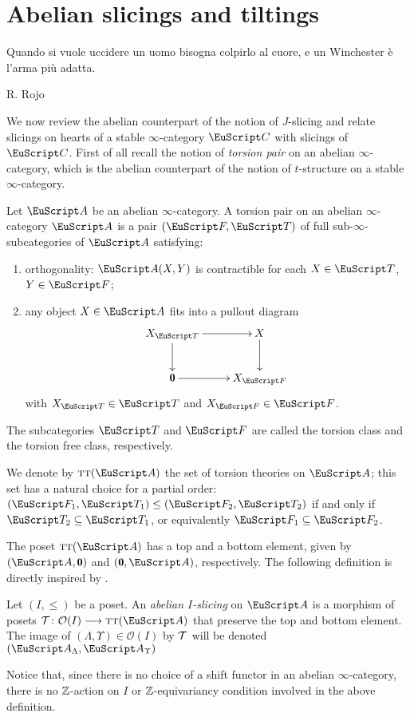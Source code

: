 \newcommand{\tilted}{\mathrel{\lightning}\!}
\section{Abelian slicings and tiltings}\label{tiltings}
\begin{modifyepigraph}{.9}
\epigraph{Quando si vuole uccidere un uomo bisogna colpirlo al cuore, e un Winchester è l'arma più adatta.}{R\@. Rojo}
\end{modifyepigraph}
We now review the abelian counterpart of the notion of $J$-slicing and relate slicings on hearts of a stable $\infty$-category $\C$ with slicings of $\C$. First of all recall the notion of \textit{torsion pair} on an abelian $\infty$-category, which is the abelian counterpart of the notion of $t$-structure on a stable $\infty$-category.
\begin{definition}
Let $\cA$ be an abelian $\infty$-category.
A torsion pair on an abelian $\infty$-category $\cA$ is a pair $(\cate{F},\cate{T})$ of full sub-$\infty$-subcategories of $\cA$ satisfying:
 \begin{enumerate}[label=$\roman*$)]
\item orthogonality: $\cA(X,Y)$ is contractible for each $X \in \cate{T}$, $Y \in \cate{F}$;
\item any object $X \in \cA$ fits into a pullout diagram
\[
\xymatrix{
X_{\cate{T}}\ar[d]\ar[r]& X\ar[d]\\
\zero\ar[r]& X_{\cate{F}}
}
\]
with $ X_{\cate{T}} \in \cate{T}$ and $X_{\cate{F}} \in \cate{F}$. 
 \end{enumerate}
 The subcategories $\cate{T}$ and $\cate{F}$ are called the torsion class and the torsion free class, respectively.
  \end{definition}
  \begin{notat}
We denote by $\tot(\cA)$ the set of torsion theories on $\cA$; this set has a natural choice for a partial order: $(\cate{F}_1, \cate{T}_1) \leq (\cate{F}_2, \cate{T}_2)$ if and only if $\cate{T}_2 \subseteq \cate{T}_1$, or equivalently $\cate{F}_1\subseteq \cate{F}_2$.
\end{notat}
The poset $\tot(\cA)$ has a top and a bottom element, given by $(\cA,\zero)$ and $(\zero,\cA)$, respectively. The following definition is directly inspired by \cite{Rud}. 
 \begin{definition}
Let $(I, \leq)$ be a poset. An \textit{abelian $I$-slicing} on $\cA$ is a morphism of posets $\T \colon \mathcal{O}(I) \to \tot (\cA)$ that preserve the top and bottom element. The image of $(\Lambda,\Upsilon)\in \mathcal{O}(I)$ by $\mathcal{T}$ will be denoted $(\cA_{\Lambda}, \cA_{\Upsilon})$
 \end{definition}
 \begin{remark}
Notice that, since there is no choice of a shift functor in an abelian $\infty$-category,  there is no $\mathbb{Z}$-action on $I$ or $\mathbb{Z}$-equivariancy condition involved in the above definition.
 \end{remark}


